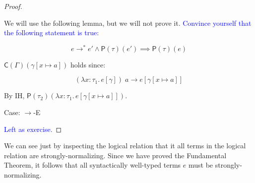 \documentclass{lecturenotes}
\newcommand{\tabs}[3]{\ensuremath{\lambda #1 \colon #2.\,#3}}
\newcommand{\app}[2]{\ensuremath{#1\;#2}}
\newcommand{\lr}[2]{\ensuremath{\mathsf{P}(#1)(#2)}}
\newcommand{\gdsubst}[2]{\ensuremath{\mathsf{C}(#1)(#2)}}
\begin{document}
\begin{proof}
\begin{enumerate}[(1)]
    We will use the following lemma, but we will not prove it.
    \textcolor{blue}{Convince yourself that the following statement is true:}

    $$e \to^\ast e' \land \lr{\tau}{e'} \implies \lr{\tau}{e}$$

    \begin{nb}
      $\gdsubst{\Gamma}{\gamma[x \mapsto a]}$ holds since:

      $$\app{(\tabs{x}{\tau_1}{e[\gamma]})}{a} \to e[\gamma[x \mapsto a]]$$
    \end{nb}

    By IH, $\lr{\tau_2}{\tabs{x}{\tau_1}{e[\gamma[x \mapsto a]]}}$.

  \end{enumerate}

  \item Case: \textsc{$\rightarrow$-E}
  
  \textcolor{blue}{Left as exercise.}

\end{proof}

We can see just by inspecting the logical relation that it all terms in the logical relation are strongly-normalizing.
Since we have proved the Fundamental Theorem, it follows that all syntactically well-typed terms $e$ must be strongly-normalizing.
\end{document}
